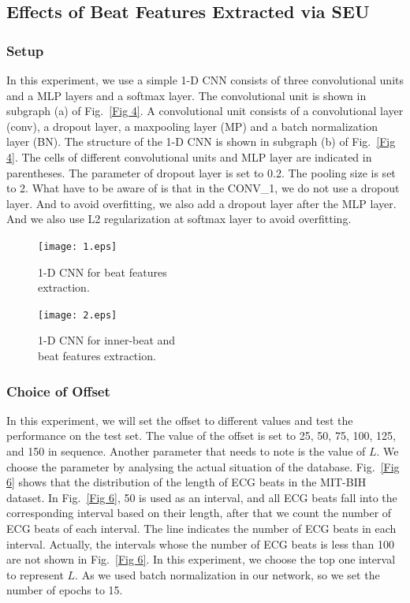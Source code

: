 \documentclass[wcp]{jmlr}
\begin{document}
\subsection{Effects of Beat Features Extracted via SEU}
\subsubsection{Setup}
In this experiment, we use a simple 1-D CNN consists of three convolutional units and a MLP layers and a softmax layer. The convolutional unit is shown in subgraph (a) of Fig.~\ref{Fig 4}. A convolutional unit consists of a convolutional layer (conv), a dropout layer, a maxpooling layer (MP) and a batch normalization layer (BN). The structure of the 1-D CNN is shown in subgraph (b) of Fig.~\ref{Fig 4}. The cells of different convolutional units and MLP layer are indicated in parentheses. The parameter of dropout layer is set to 0.2. The pooling size is set to 2. What have to be aware of is that in the CONV\_1, we do not use a dropout layer. And to avoid overfitting, we also add a dropout layer after the MLP layer. And we also use L2 regularization at softmax layer to avoid overfitting.
\noindent
\begin{figure}
\begin{center}
\begin{minipage}[c]{0.5\textwidth}
\centering
\texttt{[image: 1.eps]}
\centering
\caption{1-D CNN for beat features\\ extraction.}
\label{Fig 4}
\end{minipage}%
\begin{minipage}[c]{0.5\textwidth} 
\centering
\texttt{[image: 2.eps]}
\caption{1-D CNN for inner-beat and \\beat features extraction.}
\label{Fig 5}
\end{minipage}
\end{center}
\end{figure}
\subsubsection{Choice of Offset}
In this experiment, we will set the offset to different values and test the performance on the test set. The value of the offset is set to 25, 50, 75, 100, 125, and 150 in sequence. Another parameter that needs to note is the value of $L$. We choose the parameter by analysing the actual situation of the database. Fig.~\ref{Fig 6} shows that the distribution of the length of ECG beats in the MIT-BIH dataset. In Fig.~\ref{Fig 6}, 50 is used as an interval, and all ECG beats fall into the corresponding interval based on their length, after that we count the number of ECG beats of each interval. The line indicates the number of ECG beats in each interval. Actually, the intervals whose the number of ECG beats is less than 100 are not shown in Fig.~\ref{Fig 6}. In this experiment, we choose the top one interval to represent $L$. As we used batch normalization in our network, so we set the number of epochs to 15.
\end{document}
